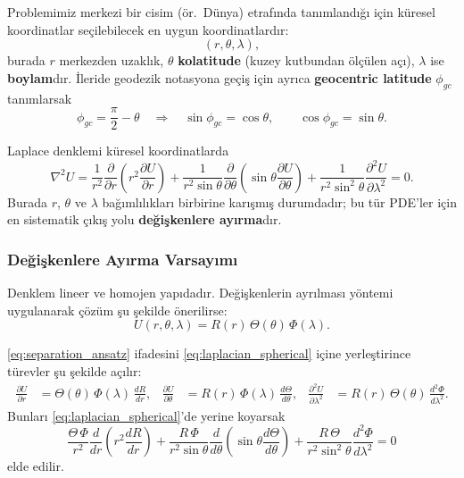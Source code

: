 Problemimiz merkezi bir cisim (ör.\ Dünya) etrafında tanımlandığı için küresel koordinatlar seçilebilecek en uygun koordinatlardır:
\[
(r,\theta,\lambda),
\]
burada $r$ merkezden uzaklık, $\theta$ \textbf{kolatitude} (kuzey kutbundan ölçülen açı), $\lambda$ ise \textbf{boylam}dır.
İleride geodezik notasyona geçiş için ayrıca \textbf{geocentric latitude} $\phi_{gc}$ tanımlarsak
\begin{equation}
\phi_{gc}=\frac{\pi}{2}-\theta
\quad\Longrightarrow\quad
\sin\phi_{gc}=\cos\theta,\qquad \cos\phi_{gc}=\sin\theta.
\label{eq:theta_phi_relation}
\end{equation}

Laplace denklemi küresel koordinatlarda
\begin{equation}
\nabla^2 U =
\frac{1}{r^2}\frac{\partial}{\partial r}
\left(r^2\frac{\partial U}{\partial r}\right)
+
\frac{1}{r^2\sin\theta}\frac{\partial}{\partial\theta}
\left(\sin\theta\frac{\partial U}{\partial\theta}\right)
+
\frac{1}{r^2\sin^2\theta}
\frac{\partial^2 U}{\partial\lambda^2}
= 0 .
\label{eq:laplacian_spherical}
\end{equation}
Burada $r$, $\theta$ ve $\lambda$ bağımlılıkları birbirine karışmış durumdadır;
bu tür PDE’ler için en sistematik çıkış yolu \textbf{değişkenlere ayırma}dır.

\subsubsection{Değişkenlere Ayırma Varsayımı}

Denklem lineer ve homojen yapıdadır. Değişkenlerin ayrılması yöntemi uygulanarak çözüm şu şekilde önerilirse:
\begin{equation}
U(r,\theta,\lambda) = R(r)\,\Theta(\theta)\,\Phi(\lambda).
\label{eq:separation_ansatz}
\end{equation}

\noindent
\eqref{eq:separation_ansatz} ifadesini \eqref{eq:laplacian_spherical} içine yerleştirince türevler şu şekilde açılır:
\begin{align}
\frac{\partial U}{\partial r} &= \Theta(\theta)\,\Phi(\lambda)\,\frac{dR}{dr},
&
\frac{\partial U}{\partial \theta} &= R(r)\,\Phi(\lambda)\,\frac{d\Theta}{d\theta},
&
\frac{\partial^2 U}{\partial \lambda^2} &= R(r)\,\Theta(\theta)\,\frac{d^2\Phi}{d\lambda^2}.
\label{eq:partials_sep}
\end{align}
Bunları \eqref{eq:laplacian_spherical}'de yerine koyarsak
\begin{equation}
\frac{\Theta\,\Phi}{r^2}\frac{d}{dr}\!\left(r^2\frac{dR}{dr}\right)
+
\frac{R\,\Phi}{r^2\sin\theta}\frac{d}{d\theta}\!\left(\sin\theta\frac{d\Theta}{d\theta}\right)
+
\frac{R\,\Theta}{r^2\sin^2\theta}\frac{d^2\Phi}{d\lambda^2}
=0
\label{eq:after_factor_out}
\end{equation}
elde edilir.

